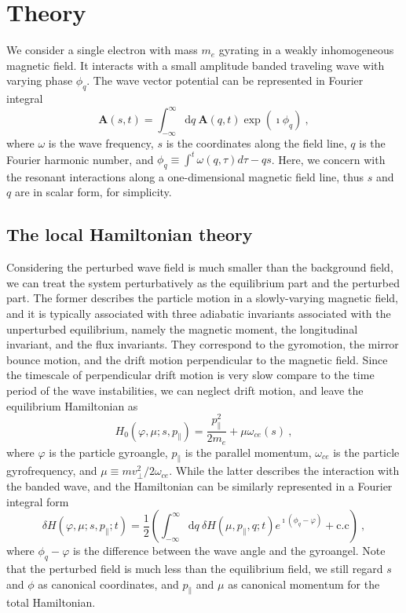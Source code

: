 \section{Theory}
\label{sec:theory}
We consider a single electron with mass $m_e$ gyrating in a weakly inhomogeneous magnetic field.
It interacts with a small amplitude banded traveling wave with varying phase $\phi_q$.
The wave vector potential can be represented in Fourier integral
\begin{equation}\label{eq.def_A}
    \mathbf{A}(s,t) =  \int_{-\infty}^{\infty}\mathrm{d} q~ \mathbf{A}\left(q,t\right) \exp(\imath\phi_{q})~,
\end{equation}
where $\omega$ is the wave frequency, $s$ is the coordinates along the field line, $q$ is the Fourier harmonic number, and $\phi_q \equiv \int^t \omega(q, \tau)d\tau - q s$.
Here, we concern with the resonant interactions along a one-dimensional magnetic field line, thus $s$ and $q$ are in scalar form, for simplicity.
\subsection{The local Hamiltonian theory}
Considering the perturbed wave field is much smaller than the background field, we can treat the system perturbatively as the equilibrium part and the perturbed part.
The former describes the particle motion in a slowly-varying magnetic field, and it is typically associated with three adiabatic invariants associated with the unperturbed equilibrium, namely the magnetic moment, the longitudinal invariant, and the flux invariants.
They correspond to the gyromotion, the mirror bounce motion, and the drift motion perpendicular to the magnetic field.
Since the timescale of perpendicular drift motion is very slow compare to the time period of the wave instabilities, we can neglect drift motion, and leave the equilibrium Hamiltonian as
\begin{equation}
    H_0(\varphi,\mu;s,p_\|) =  \frac{p_\|^2}{2 m_e} + \mu \omega_{ce}(s)~,
\end{equation}
where $\varphi$ is the particle gyroangle, $p_\|$ is the parallel momentum, $\omega_{ce}$ is the particle gyrofrequency, and $\mu \equiv m v_\perp^2/2 \omega_{ce}$.
While the latter describes the interaction with the banded wave, and the Hamiltonian can be similarly represented in a Fourier integral form
\begin{equation}\label{eq.def_H}
    \delta H(\varphi,\mu; s,p_\|;t) = \frac{1}{2}\left(\int_{-\infty}^{\infty} \mathrm{d} q~{\delta H}\left(\mu, p_\|, q ; t\right) e^{\imath\left(\phi_{q}-\varphi\right)}+ \mathrm{c.c}\right)~,
\end{equation}
where $\phi_q - \varphi$ is the difference between the wave angle and the gyroangel.
Note that the perturbed field is much less than the equilibrium field, we still regard $s$ and $\phi$ as canonical coordinates, and $p_\parallel$ and $\mu$ as canonical momentum for the total Hamiltonian.

